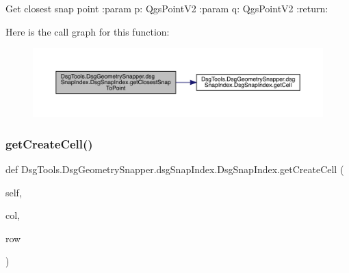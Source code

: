 \begin{DoxyVerb}Get closest snap point
:param p: QgsPointV2
:param q: QgsPointV2
:return:
\end{DoxyVerb}
 Here is the call graph for this function\+:
\nopagebreak
\begin{figure}[H]
\begin{center}
\leavevmode
\includegraphics[width=350pt]{class_dsg_tools_1_1_dsg_geometry_snapper_1_1dsg_snap_index_1_1_dsg_snap_index_a98c7217540299dec84c5613c06143167_cgraph}
\end{center}
\end{figure}
\mbox{\label{class_dsg_tools_1_1_dsg_geometry_snapper_1_1dsg_snap_index_1_1_dsg_snap_index_a3ffaa95a4802e8d2185c0cc72cab0527}} 
\subsubsection{\texorpdfstring{get\+Create\+Cell()}{getCreateCell()}}
{\footnotesize\ttfamily def Dsg\+Tools.\+Dsg\+Geometry\+Snapper.\+dsg\+Snap\+Index.\+Dsg\+Snap\+Index.\+get\+Create\+Cell (\begin{DoxyParamCaption}\item[{}]{self,  }\item[{}]{col,  }\item[{}]{row }\end{DoxyParamCaption})}

